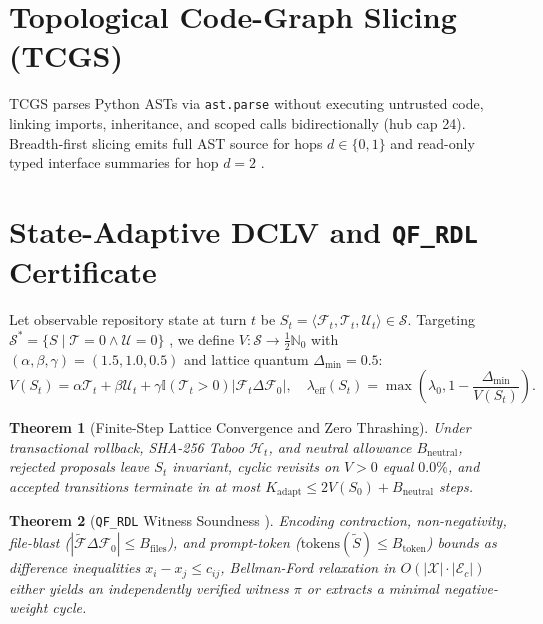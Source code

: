 \documentclass[10pt,twocolumn]{article}
\newtheorem{theorem}{Theorem}
\begin{document}
\section{Topological Code-Graph Slicing (TCGS)}
TCGS parses Python ASTs via \texttt{ast.parse} without executing untrusted code, linking imports, inheritance, and scoped calls bidirectionally (hub cap 24). Breadth-first slicing emits full AST source for hops $d \in \{0,1\}$ and read-only typed interface summaries for hop $d=2$ \cite{kgllmbench}.

\section{State-Adaptive DCLV and \texttt{QF\_RDL} Certificate}
Let observable repository state at turn $t$ be $S_t = \langle \mathcal{F}_t, \mathcal{T}_t, \mathcal{U}_t \rangle \in \mathcal{S}$. Targeting $\mathcal{S}^* = \{S \mid \mathcal{T}=0 \land \mathcal{U}=0\}$ \cite{banach,khalil}, we define $V: \mathcal{S} \to \frac{1}{2}\mathbb{N}_0$ with $(\alpha,\beta,\gamma)=(1.5,1.0,0.5)$ and lattice quantum $\Delta_{\min}=0.5$:
\begin{equation}
V(S_t) = \alpha \mathcal{T}_t + \beta \mathcal{U}_t + \gamma \mathbb{I}(\mathcal{T}_t > 0) |\mathcal{F}_t \Delta \mathcal{F}_0|, \quad \lambda_{\text{eff}}(S_t) = \max\!\left(\lambda_0, 1 - \frac{\Delta_{\min}}{V(S_t)}\right).
\end{equation}

\begin{theorem}[Finite-Step Lattice Convergence and Zero Thrashing]
Under transactional rollback, SHA-256 Taboo $\mathcal{H}_t$, and neutral allowance $B_{\text{neutral}}$, rejected proposals leave $S_t$ invariant, cyclic revisits on $V>0$ equal $0.0\%$, and accepted transitions terminate in at most $K_{\text{adapt}} \le 2V(S_0) + B_{\text{neutral}}$ steps.
\end{theorem}

\begin{theorem}[\texttt{QF\_RDL} Witness Soundness \cite{nieuwenhuis2006}]
Encoding contraction, non-negativity, file-blast ($|\tilde{\mathcal{F}} \Delta \mathcal{F}_0| \le B_{\text{files}}$), and prompt-token ($\text{tokens}(\tilde{S}) \le B_{\text{token}}$) bounds as difference inequalities $x_i - x_j \le c_{ij}$, Bellman-Ford relaxation in $O(|\mathcal{X}|\cdot|\mathcal{E}_c|)$ either yields an independently verified witness $\pi$ or extracts a minimal negative-weight cycle.
\end{theorem}
\end{document}
